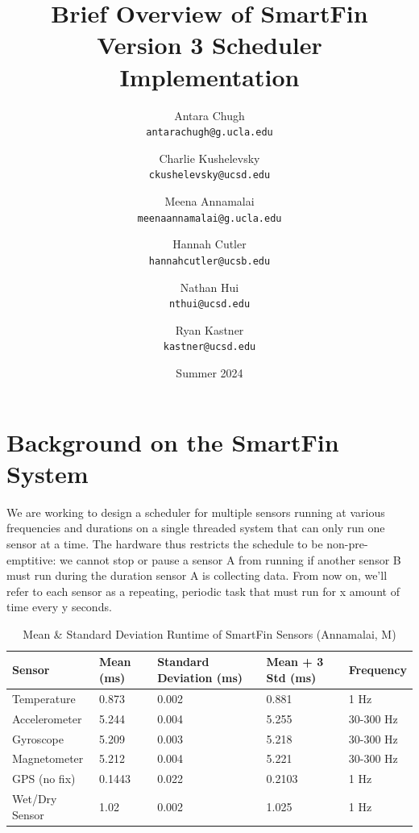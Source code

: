 \documentclass{article}
\title{Brief Overview of SmartFin Version 3 Scheduler Implementation}
\author{Antara Chugh\\ \texttt{antarachugh@g.ucla.edu}
    \and Charlie Kushelevsky\\ \texttt{ckushelevsky@ucsd.edu}
    \and Meena Annamalai\\ \texttt{meenaannamalai@g.ucla.edu}
    \and Hannah Cutler\\ \texttt{hannahcutler@ucsb.edu}
    \and Nathan Hui\\ \texttt{nthui@ucsd.edu}
    \and Ryan Kastner\\ \texttt{kastner@ucsd.edu}}
\date{Summer 2024}
\begin{document}
\maketitle

\section{Background on the SmartFin System}

We are working to design a scheduler for multiple sensors running at various frequencies and durations on a single threaded system that can only run one sensor at a time. The hardware thus restricts the schedule to be non-pre-emptitive: we cannot stop or pause a sensor A from running if another sensor B must run during the duration sensor A is collecting data. From now on, we'll refer to each sensor as a repeating, periodic task that must run for x amount of time every y seconds.






\begin{table}[h]
\centering
\caption{Mean \& Standard Deviation Runtime of SmartFin Sensors (Annamalai, M)}
\label{tab:sensor_runtime}
\begin{tabular}{@{}lllll@{}}
\toprule
Sensor                          & Mean (ms) & Standard Deviation (ms) & Mean + 3 Std (ms) & Frequency \\ \midrule
Temperature                     & 0.873     & 0.002                   & 0.881             & 1 Hz      \\
    Accelerometer                   & 5.244     & 0.004                   & 5.255             & 30-300 Hz \\
    Gyroscope                       & 5.209     & 0.003                   & 5.218             & 30-300 Hz \\
    Magnetometer                    & 5.212     & 0.004                   & 5.221             & 30-300 Hz \\
    GPS (no fix) & 0.1443    & 0.022                   & 0.2103            & 1 Hz      \\
    Wet/Dry Sensor                  & 1.02      & 0.002                   & 1.025             & 1 Hz      \\ \bottomrule
    \end{tabular}
\end{table}
\end{document}
